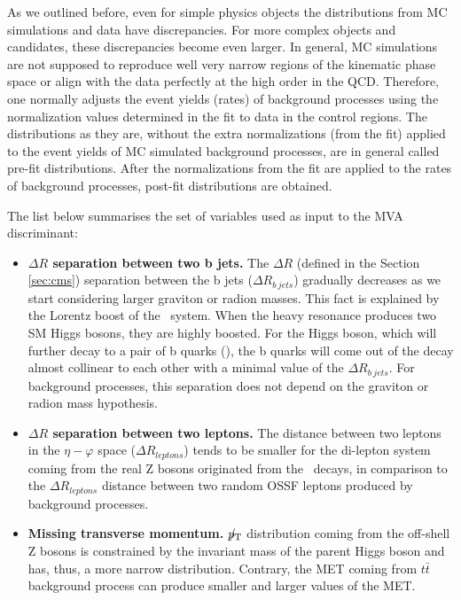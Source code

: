 \begin{small}
As we outlined before, even for simple physics objects the distributions from MC simulations and data have discrepancies. For more complex objects and candidates, these discrepancies become even larger. In general, MC simulations are not supposed to reproduce well very narrow regions of the kinematic phase space or align with the data perfectly at the high order in the QCD. Therefore, one normally adjusts the event yields (rates) of background processes using the normalization values determined in the fit to data in the control regions. The distributions as they are, without the extra normalizations (from the fit) applied to the event yields of MC simulated background processes, are in general called pre-fit distributions. After the normalizations from the fit are applied to the rates of background processes, post-fit distributions are obtained. 

The list below summarises the set of variables used as input to the MVA discriminant:

\begin{itemize}

\item{\bfseries $\Delta R$ separation between two b jets.}
The $\Delta R$ (defined in the Section \ref{sec:cms}) separation between the b jets ($\Delta R_{b\ jets}$) gradually decreases as we start considering larger graviton or radion masses. This fact is explained by the Lorentz boost of the \HBB~system. When the heavy resonance produces two SM Higgs bosons, they are highly boosted. For the Higgs boson, which will further decay to a pair of b quarks (\HBB), the b quarks will come out of the decay almost collinear to each other with a minimal value of the $\Delta R_{b\ jets}$. For background processes, this separation does not depend on the graviton or radion mass hypothesis. 

\item{\bfseries $\Delta R$ separation between two leptons.}
The distance between two leptons in the $\eta - \varphi$ space ($\Delta R_{leptons}$) tends to be smaller for the di-lepton system coming from the real Z bosons originated from the \HZZ~decays, in comparison to the $\Delta R_{leptons}$ distance between two random OSSF leptons produced by background processes. 

\item{\bfseries Missing transverse momentum.}
${p}_\mathrm{T}\hspace{-1.02em}/\kern 0.5em$ distribution coming from the off-shell Z bosons is constrained by the invariant mass of the parent Higgs boson and has, thus, a more narrow distribution. Contrary, the MET coming from $t\bar{t}$ background process can produce smaller and larger values of the MET. 


\end{itemize}
\end{small}
